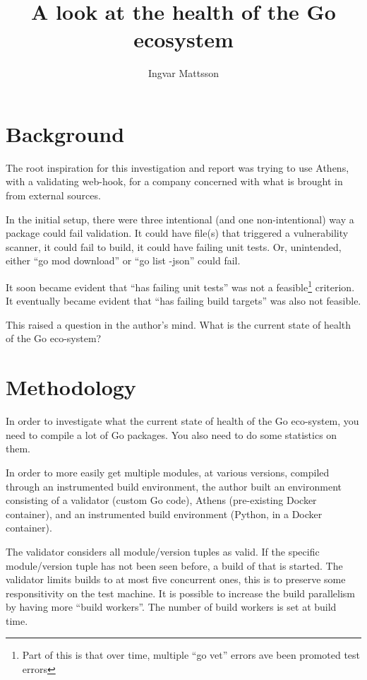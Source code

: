 \documentclass[a4paper]{paper}
\begin{document}
\title{A look at the health of the Go ecosystem}
\author{Ingvar Mattsson}

\maketitle

\section{Background}

The root inspiration for this investigation and report was trying to
use Athens, with a validating web-hook, for a company concerned with
what is brought in from external sources.

In the initial setup, there were three intentional (and one
non-intentional) way a package could fail validation. It could have
file(s) that triggered a vulnerability scanner, it could fail to
build, it could have failing unit tests. Or, unintended, either ``go
mod download'' or ``go list -json'' could fail.

It soon became evident that ``has failing unit tests'' was not a
feasible\footnote{Part of this is that over time, multiple ``go vet''
  errors ave been promoted test errors} criterion. It eventually
became evident that ``has failing build targets'' was also not
feasible.

This raised a question in the author's mind. What is the current state
of health of the Go eco-system?

\section{Methodology}

In order to investigate what the current state of health of the Go
eco-system, you need to compile a lot of Go packages. You also need to
do some statistics on them.

In order to more easily get multiple modules, at various versions,
compiled through an instrumented build environment, the author built
an environment consisting of a validator (custom Go code), Athens
(pre-existing Docker container), and an instrumented build environment
(Python, in a Docker container).



The validator considers all module/version tuples as valid. If the
specific module/version tuple has not been seen before, a build of
that is started. The validator limits builds to at most five
concurrent ones, this is to preserve some responsitivity on the test
machine. It is possible to increase the build parallelism by having
more ``build workers''. The number of build workers is set at build
time.
\end{document}

